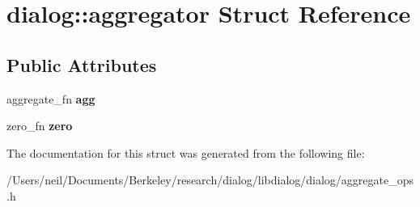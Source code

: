 \hypertarget{structdialog_1_1aggregator}{}\section{dialog\+:\+:aggregator Struct Reference}
\label{structdialog_1_1aggregator}
\subsection*{Public Attributes}
\begin{DoxyCompactItemize}
\item 
\mbox{\label{structdialog_1_1aggregator_a5a91547695c27e0a3d0cfc9a75dbd2ca}} 
aggregate\+\_\+fn {\bfseries agg}
\item 
\mbox{\label{structdialog_1_1aggregator_a620248277a8e4654c9f66b2b5deb7cbe}} 
zero\+\_\+fn {\bfseries zero}
\end{DoxyCompactItemize}


The documentation for this struct was generated from the following file\+:\begin{DoxyCompactItemize}
\item 
/\+Users/neil/\+Documents/\+Berkeley/research/dialog/libdialog/dialog/aggregate\+\_\+ops.\+h\end{DoxyCompactItemize}
